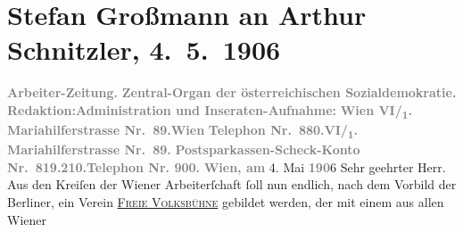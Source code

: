 

               \section[Stefan Großmann an Arthur Schnitzler, 4. 5. 1906]{ Stefan Großmann an Arthur Schnitzler, 4. 5. 1906}\nopagebreak{}\rehead{ }\begin{ledgroupsized}[t]{13cm}\normalsize\beginnumbering{} \toendnotes[C]{\smallbreak\pagebreak[2]} 
\pstart
           \noindent{}\centering{}{\pb}\textcolor{gray}{\textbf{Arbeiter-Zeitung.}}\pend
           \pstart
           \noindent{}\centering{}\textcolor{gray}{\textbf{Zentral-Organ der österreichischen Sozialdemokratie.}}\pend
           \pstart
           \noindent{}\textcolor{gray}{\textbf{Redaktion:}}\hfill \textcolor{gray}{\textbf{Administration und Inseraten-Aufnahme:}}\pend
           \pstart
           \textcolor{gray}{\textbf{Wien VI/\textsubscript{1}. Mariahilferstrasse Nr. 89.}}\hfill \textcolor{gray}{\textbf{Wien}}\pend
           \pstart
           \textcolor{gray}{\textbf{Telephon Nr. 880.}}\hfill \textcolor{gray}{\textbf{VI/\textsubscript{1}. Mariahilferstrasse
                           Nr. 89.}}\pend
           \pstart
           \textcolor{gray}{\textbf{Postsparkassen-Scheck-Konto Nr. 819.210.}}\hfill \textcolor{gray}{\textbf{Telephon Nr. 900.}}\pend
           \pstart
           \raggedleft{}\textcolor{gray}{\textbf{Wien, am}}{ }4. Mai \textcolor{gray}{\textbf{190}}6\pend
           \pstart{}Sehr geehrter Herr.\pend\pstart
           Aus den Kreiſen der Wiener Arbeiterſchaft ſoll nun endlich, nach dem Vorbild der Berliner, ein Verein \textsc{\uline{Freie Volksbühne}} gebildet werden, der mit einem aus allen Wiener

\end{ledgroupsized}

